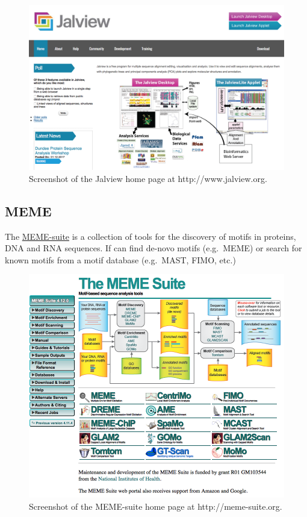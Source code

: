 \documentclass[]{book}
\theoremstyle{definition}
\theoremstyle{definition}
\theoremstyle{definition}
\theoremstyle{remark}
\begin{document}
\begin{figure}
\includegraphics[width=16.9in]{pic/jalview_web} \caption{Screenshot of the Jalview home page at http://www.jalview.org.}\label{fig:jalview-web}
\end{figure}

\subsection{MEME}\label{meme}

The \href{http://meme-suite.org}{MEME-suite} is a collection of tools
for the discovery of motifs in proteins, DNA and RNA sequences. If can
find de-novo motifs (e.g.~MEME) or search for known motifs from a motif
database (e.g.~MAST, FIMO, etc.)

\begin{figure}
\includegraphics[width=11.78in]{pic/meme_web} \caption{Screenshot of the MEME-suite home page at http://meme-suite.org.}\label{fig:meme-web}
\end{figure}
\end{document}
